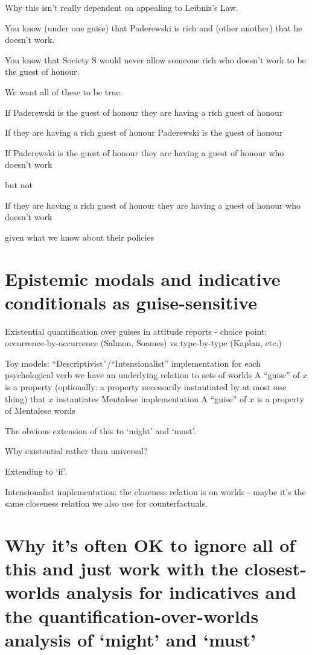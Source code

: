 \documentclass[If.tex]{subfiles}
\begin{document}
Why this isn't really dependent on appealing to Leibniz's Law.

You know (under one guise) that Paderewski is rich and (other another) that he doesn't work. 

You know that Society S would never allow someone rich who doesn't work to be the guest of honour.

We want all of these to be true: 

If Paderewski is the guest of honour they are having a rich guest of honour

If they are having a rich guest of honour Paderewski is the guest of honour

If Paderewski is the guest of honour they are having a guest of honour who doesn't work

but not

If they are having a rich guest of honour they are having a guest of honour who doesn't work

given what we know about their policies


\section{Epistemic modals and indicative conditionals as guise-sensitive}
Existential quantification over guises in attitude reports 
	- choice point: occurrence-by-occurrence (Salmon, Soames) vs type-by-type (Kaplan, etc.)

Toy models: 
	“Descriptivist”/“Intensionalist” implementation
		for each psychological verb we have an underlying relation to sets of worlds
		A “guise” of $x$ is a property (optionally: a property necessarily instantiated by at most one thing) that $x$ instantiates
	Mentalese implementation
		A “guise” of $x$ is a property of Mentalese words

The obvious extension of this to ‘might’ and ‘must’.  

Why existential rather than universal?  

Extending to ‘if’.  

Intensionalist implementation: the closeness relation is on worlds - maybe it's the same closeness relation we also use for counterfactuals.  

\section{Why it's often OK to ignore all of this and just work with the closest-worlds analysis for indicatives and the quantification-over-worlds analysis of ‘might’ and ‘must’}
\end{document}
